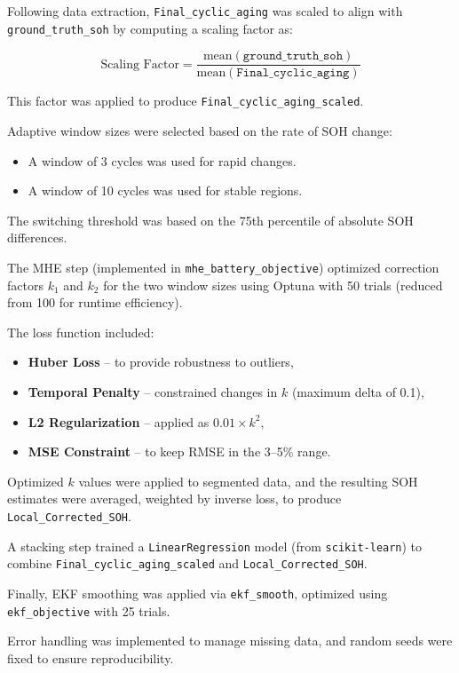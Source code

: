Following data extraction, \texttt{Final\_cyclic\_aging} was scaled to align with\\ \texttt{ground\_truth\_soh} by computing a scaling factor as:

\[
\text{Scaling Factor} = \frac{\text{mean}(\texttt{ground\_truth\_soh})}{\text{mean}(\texttt{Final\_cyclic\_aging})}
\]

This factor was applied to produce \texttt{Final\_cyclic\_aging\_scaled}.

Adaptive window sizes were selected based on the rate of SOH change:
\begin{itemize}
    \item A window of 3 cycles was used for rapid changes.
    \item A window of 10 cycles was used for stable regions.
\end{itemize}
The switching threshold was based on the 75th percentile of absolute SOH differences.

The MHE step (implemented in \texttt{mhe\_battery\_objective}) optimized correction factors $k_1$ and $k_2$ for the two window sizes using Optuna with 50 trials (reduced from 100 for runtime efficiency).

The loss function included:
\begin{itemize}
    \item \textbf{Huber Loss} – to provide robustness to outliers,
    \item \textbf{Temporal Penalty} – constrained changes in $k$ (maximum delta of 0.1),
    \item \textbf{L2 Regularization} – applied as $0.01 \times k^2$,
    \item \textbf{MSE Constraint} – to keep RMSE in the 3--5\% range.
\end{itemize}

Optimized $k$ values were applied to segmented data, and the resulting SOH estimates were averaged, weighted by inverse loss, to produce \texttt{Local\_Corrected\_SOH}.

A stacking step trained a \texttt{LinearRegression} model (from \texttt{scikit-learn}) to combine \texttt{Final\_cyclic\_aging\_scaled} and \texttt{Local\_Corrected\_SOH}.

Finally, EKF smoothing was applied via \texttt{ekf\_smooth}, optimized using \texttt{ekf\_objective} with 25 trials.

Error handling was implemented to manage missing data, and random seeds were fixed to ensure reproducibility.

